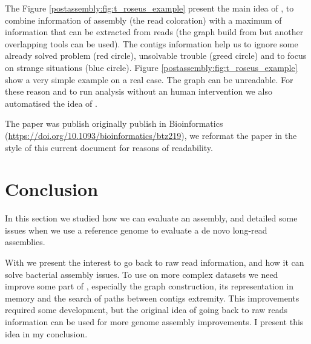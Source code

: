 \documentclass[main.tex]{subfiles}
\begin{document}
The Figure \ref{postassembly:fig:t_roseus_example} present the main idea of \knot, to combine information of assembly (the read coloration) with a maximum of information that can be extracted from reads (the \OLC graph build from \minimap but another overlapping tools can be used). The   contigs information help us to ignore some already solved problem (red circle), unsolvable trouble (greed circle) and  to focus on strange situations (blue circle). Figure \ref{postassembly:fig:t_roseus_example} show a very simple example on a real case. The \OLC graph can be unreadable. For these reason and to run analysis without an human intervention we also automatised the idea of \knot.%

The paper was publish originally publish in Bioinformatics (\url{https://doi.org/10.1093/bioinformatics/btz219}), we reformat the paper in the style of this current document for reasons of readability.



\section{Conclusion}

In this section we studied how we can evaluate an assembly, and detailed some issues when we use a reference genome to evaluate a de novo long-read assemblies.

With \knot we present the interest to go back to raw read information, and how it can solve  bacterial assembly issues.
To use \knot on more complex datasets we need improve some part of \knot, especially the graph construction, its representation in memory and the search of paths between contigs extremity. This improvements required some development, but the original idea of going back to raw reads information can be used for more genome assembly improvements. I present this idea in my conclusion. %
\end{document}

